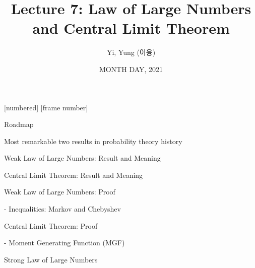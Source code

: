 

\csname\pdfmode\endcsname

{
  [numbered]
  [frame number]  %
} 



\title[]{Lecture 7: Law of Large Numbers and Central Limit Theorem}
\author{Yi, Yung (이융)}
\date{MONTH DAY, 2021}








\begin{frame}
  \titlepage
\end{frame}





\begin{frame}{Roadmap}

\plitemsep 0.1in

\bci 
\item Most remarkable two results in probability theory history

\bigskip

\item Weak Law of Large Numbers: Result and Meaning
\item Central Limit Theorem: Result and Meaning
\item Weak Law of Large Numbers: Proof

- Inequalities: Markov and Chebyshev

\item Central Limit Theorem: Proof

- Moment Generating Function (MGF)

\item Strong Law of Large Numbers
\eci 

\end{frame}

